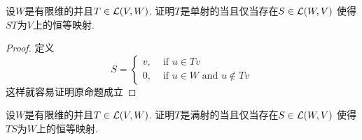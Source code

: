 \begin{problem}{20}
设$W$是有限维的并且$T\in\mathcal{L}(V,W)$.
证明$T$是单射的当且仅当存在$S\in\mathcal{L}(W,V)$
使得$ST$为$V$上的恒等映射.
\end{problem}

\begin{proof}
	定义
	\begin{displaymath}
		S = \begin{cases}
			v, & \text{ if } u\in Tv                        \\
			0, & \text{ if } u\in W \text{ and } u\notin Tv
		\end{cases}
	\end{displaymath}
	这样就容易证明原命题成立
\end{proof}

\begin{problem}{21}
设$W$是有限维的并且$T\in\mathcal{L}(V,W)$.
证明$T$是满射的当且仅当存在$S\in\mathcal{L}(W,V)$
使得$TS$为$W$上的恒等映射.
\end{problem}

